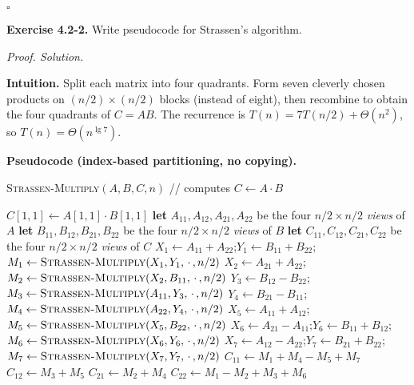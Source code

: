 \documentclass[12pt]{article}
\theoremstyle{definition}
\begin{document}
\hfill$\square$

\newpage

\noindent\textbf{Exercise 4.2-2.}
Write pseudocode for Strassen’s algorithm.

\medskip
\noindent\textit{Proof. Solution.}

\noindent\textbf{Intuition.}
Split each matrix into four quadrants. Form seven cleverly chosen products on $(n/2)\times(n/2)$
blocks (instead of eight), then recombine to obtain the four quadrants of $C=AB$.
The recurrence is $T(n)=7T(n/2)+\Theta(n^2)$, so $T(n)=\Theta(n^{\lg 7})$.

\noindent\textbf{Pseudocode (index-based partitioning, no copying).}
\begin{algorithm}[H]
\caption{\textsc{Strassen-Multiply}$(A,B,C,n)$ \quad // computes $C\gets A\cdot B$}
\begin{algorithmic}[1]
  \State $C[1,1]\gets A[1,1]\cdot B[1,1]$ \State \Return
\EndIf
\State \textbf{let} $A_{11},A_{12},A_{21},A_{22}$ be the four $n/2\times n/2$ \emph{views} of $A$
\State \textbf{let} $B_{11},B_{12},B_{21},B_{22}$ be the four $n/2\times n/2$ \emph{views} of $B$
\State \textbf{let} $C_{11},C_{12},C_{21},C_{22}$ be the four $n/2\times n/2$ \emph{views} of $C$
\Statex
\State $X_1\gets A_{11}+A_{22}$;\quad $Y_1\gets B_{11}+B_{22}$;\quad $M_1\gets \textsc{Strassen-Multiply}(X_1,Y_1,\,\cdot\,,n/2)$
\State $X_2\gets A_{21}+A_{22}$;\quad \phantom{$Y_2\gets$} \ \ \ \ \ \ \ \ \ \ $M_2\gets \textsc{Strassen-Multiply}(X_2,B_{11},\,\cdot\,,n/2)$
\State $Y_3\gets B_{12}-B_{22}$;\quad \phantom{$X_3\gets$} \ \ \ \ \ \ \ \ \ \ $M_3\gets \textsc{Strassen-Multiply}(A_{11},Y_3,\,\cdot\,,n/2)$
\State $Y_4\gets B_{21}-B_{11}$;\quad \phantom{$X_4\gets$} \ \ \ \ \ \ \ \ \ \ $M_4\gets \textsc{Strassen-Multiply}(A_{22},Y_4,\,\cdot\,,n/2)$
\State $X_5\gets A_{11}+A_{12}$;\quad \phantom{$Y_5\gets$} \ \ \ \ \ \ \ \ \ \ $M_5\gets \textsc{Strassen-Multiply}(X_5,B_{22},\,\cdot\,,n/2)$
\State $X_6\gets A_{21}-A_{11}$;\quad $Y_6\gets B_{11}+B_{12}$;\quad $M_6\gets \textsc{Strassen-Multiply}(X_6,Y_6,\,\cdot\,,n/2)$
\State $X_7\gets A_{12}-A_{22}$;\quad $Y_7\gets B_{21}+B_{22}$;\quad $M_7\gets \textsc{Strassen-Multiply}(X_7,Y_7,\,\cdot\,,n/2)$
\Statex
\State $C_{11}\gets M_1+M_4-M_5+M_7$
\State $C_{12}\gets M_3+M_5$
\State $C_{21}\gets M_2+M_4$
\State $C_{22}\gets M_1-M_2+M_3+M_6$
\end{algorithmic}
\end{algorithm}
\end{document}
